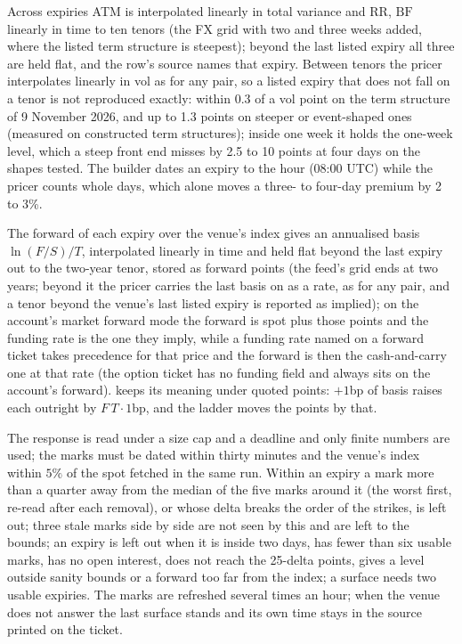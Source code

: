 \documentclass[11pt,a4paper]{article}
\newcommand{\code}[1]{\ifmmode\text{\small\texttt{\detokenize{#1}}}\else{\small\path{#1}}\fi}
\begin{document}
Across expiries ATM is interpolated linearly in total variance and $\mathrm{RR}$, $\mathrm{BF}$ linearly in time to ten tenors (the FX grid with two and three weeks added, where the listed term structure is steepest); beyond the last listed expiry all three are held flat, and the row's source names that expiry. Between tenors the pricer interpolates linearly in vol as for any pair, so a listed expiry that does not fall on a tenor is not reproduced exactly: within 0.3 of a vol point on the term structure of 9 November 2026, and up to 1.3 points on steeper or event-shaped ones (measured on constructed term structures); inside one week it holds the one-week level, which a steep front end misses by 2.5 to 10 points at four days on the shapes tested. The builder dates an expiry to the hour (08:00 UTC) while the pricer counts whole days, which alone moves a three- to four-day premium by 2 to 3\%.

The forward of each expiry over the venue's index gives an annualised basis $\ln(F/S)/T$, interpolated linearly in time and held flat beyond the last expiry out to the two-year tenor, stored as forward points \code{{ASSET}USD_FWD} (the feed's grid ends at two years; beyond it the pricer carries the last basis on as a rate, as for any pair, and a tenor beyond the venue's last listed expiry is reported as implied); on the account's market forward mode the forward is spot plus those points and the funding rate is the one they imply, while a funding rate named on a forward ticket takes precedence for that price and the forward is then the cash-and-carry one at that rate (the option ticket has no funding field and always sits on the account's forward). \code{CRYBASIS01} keeps its meaning under quoted points: $+1$bp of basis raises each outright by $F\,T\cdot 1$bp, and the ladder moves the points by that.

The response is read under a size cap and a deadline and only finite numbers are used; the marks must be dated within thirty minutes and the venue's index within $5\%$ of the spot fetched in the same run. Within an expiry a mark more than a quarter away from the median of the five marks around it (the worst first, re-read after each removal), or whose delta breaks the order of the strikes, is left out; three stale marks side by side are not seen by this and are left to the bounds; an expiry is left out when it is inside two days, has fewer than six usable marks, has no open interest, does not reach the 25-delta points, gives a level outside sanity bounds or a forward too far from the index; a surface needs two usable expiries. The marks are refreshed several times an hour; when the venue does not answer the last surface stands and its own time stays in the source printed on the ticket.
\end{document}
